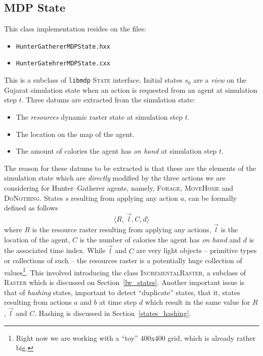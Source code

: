 \documentclass[a4paper,10pt]{article}
\begin{document}
\subsection{MDP State}

This class implementation resides on the files:
\begin{itemize}
\item \texttt{HunterGathererMDPState.hxx}
\item \texttt{HunterGatehrerMDPState.cxx}
\end{itemize}

This is a subclass of \texttt{libmdp} \textsc{State} interface. Initial states $s_0$ are a \emph{view} on the Gujarat simulation
state when an action is requested from an agent at simulation step $t$. Three datums are extracted from the simulation state:
\begin{itemize}
\item The \emph{resources} dynamic raster state at simulation step $t$.
\item The location on the map of the agent.
\item The amount of calories the agent has \emph{on hand} at simulation step $t$.
\end{itemize}
The reason for these datums to be extracted is that these are the elements of the simulation state which are \emph{directly}
modified by the three actions we are considering for Hunter--Gatherer agents, namely, \textsc{Forage}, \textsc{MoveHome}
and \textsc{DoNothing}. States $s$ resulting from applying any action $a$, can be formally defined as follows
\begin{equation*}
\langle R,\ \vec{l}, C, d \rangle
\end{equation*}
where $R$ is the resource raster resulting from applying any actions, $\vec{l}$ is the location of the agent, $C$ is
the number of calories the agent has \emph{on hand} and $d$ is the associated time index. While $\vec{l}$ and $C$ are
very light objects -- primitive types or collections of such -- the resources raster is a potentially huge collection
of values\footnote{Right now we are working with a ``toy'' $400$x$400$ grid, which is already rather big.}. This involved
introducing the class \textsc{IncrementalRaster}, a subclass of \textsc{Raster} which is 
discussed on Section~\ref{lw_states}. Another important issue is that of \emph{hashing} states, important to detect
``duplicate'' states, that it, states resulting from actions $a$ and $b$ at time step $d$ which result in the same
value for $R$, $\vec{l}$ and $C$. Hashing is discussed in Section~\ref{states_hashing}.
\end{document}

